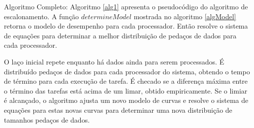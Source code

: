 Algoritmo Completo: Algoritmo \ref{alg1} apresenta o pseudocódigo do algoritmo de escalonamento. A função $determineModel$ mostrada no algoritmo \ref{algModel} retorna o modelo de desempenho para cada processador. Então resolve o sistema de equações para determinar a melhor distribuição de pedaços de dados para cada processador.

O laço inicial repete enquanto há dados ainda para serem processados. É distribuído pedaços de dados para cada processador do sistema, obtendo o tempo de término para cada execução de tarefa. É checado se a diferença máxima entre o término das tarefas está acima de um limar, obtido empiricamente. Se o limiar é alcançado, o algoritmo ajusta um novo modelo de curvas e resolve o sistema de equações para estas novas curvas para determinar uma nova distribuição de tamanhos pedaços de dados.

 
	










